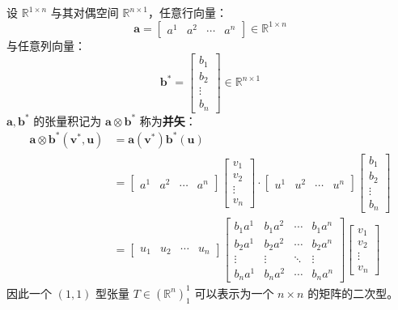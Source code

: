 \begin{example}[并矢 Dyadics]
    设 $\mathbb{R}^{1\times n}$ 与其对偶空间 $\mathbb{R}^{n\times 1}$，任意行向量：
    \[
        \mathbf{a} = \begin{bmatrix}
            a^1 & a^2 & \cdots & a^n
        \end{bmatrix} \in \mathbb{R}^{1\times n}
    \]
    与任意列向量：
    \[
        \mathbf{b}^* = \begin{bmatrix}
            b_1 \\ b_2 \\ \vdots \\ b_n
        \end{bmatrix} \in \mathbb{R}^{n\times 1}
    \]
    $\mathbf{a}, \mathbf{b}^*$ 的张量积记为 $\mathbf{a}\otimes \mathbf{b}^*$ 称为\textbf{并矢}：
    \begin{align*}
        \mathbf{a}\otimes \mathbf{b}^*(\mathbf{v}^*,\mathbf{u}) &= \mathbf{a}(\mathbf{v}^*)\mathbf{b}^*(\mathbf{u})\\
        &=  \begin{bmatrix}
            a^1 & a^2 & \cdots & a^n
        \end{bmatrix} \begin{bmatrix}
            v_1 \\ v_2 \\ \vdots \\ v_n
        \end{bmatrix} \cdot 
        \begin{bmatrix}
            u^1 & u^2 & \cdots & u^n
        \end{bmatrix} \begin{bmatrix}
            b_1 \\ b_2 \\ \vdots \\ b_n
        \end{bmatrix}  \\
        &= \begin{bmatrix}
            u_1 & u_2 & \cdots & u_n
        \end{bmatrix} \begin{bmatrix}
            b_1a^1 & b_1a^2 & \cdots & b_1a^n \\
            b_2a^1 & b_2a^2 & \cdots & b_2a^n \\
            \vdots & \vdots & \ddots & \vdots \\
            b_na^1 & b_na^2 & \cdots & b_na^n
        \end{bmatrix}\begin{bmatrix}
            v_1 \\ v_2 \\ \vdots \\ v_n
        \end{bmatrix}
    \end{align*}
    因此一个 $(1,1)$ 型张量 $T \in (\mathbb{R}^n)^1_1$ 可以表示为一个 $n\times n$ 的矩阵的二次型。
    \label{ex:dyadics}
\end{example}

